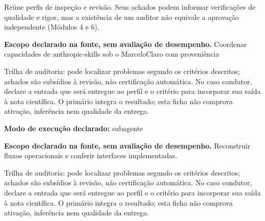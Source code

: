 \begin{descricao}
Reúne perfis de inspeção e revisão. Seus achados podem informar verificações de qualidade e rigor, mas a existência de um auditor não equivale a aprovação independente (Módulos 4 e 6).
\end{descricao}


\begin{descricao}
\textbf{Escopo declarado na fonte, sem avaliação de desempenho.}
Coordenar capacidades de anthropic-skills sob o MarceloClaro com proveniência
\end{descricao}

\begin{funcao}
Trilha de auditoria: pode localizar problemas segundo os critérios descritos; achados são subsídios à revisão, não certificação automática. No caso condutor, declare a entrada que será entregue ao perfil e o critério para incorporar sua saída à nota científica. O primário integra o resultado; esta ficha não comprova ativação, inferência nem qualidade da entrega.
\end{funcao}

\begin{arquitetura}
\textbf{Modo de execução declarado:} subagente
\end{arquitetura}


\begin{descricao}
\textbf{Escopo declarado na fonte, sem avaliação de desempenho.}
Reconstruir fluxos operacionais e conferir interfaces implementadas.
\end{descricao}

\begin{funcao}
Trilha de auditoria: pode localizar problemas segundo os critérios descritos; achados são subsídios à revisão, não certificação automática. No caso condutor, declare a entrada que será entregue ao perfil e o critério para incorporar sua saída à nota científica. O primário integra o resultado; esta ficha não comprova ativação, inferência nem qualidade da entrega.
\end{funcao}

